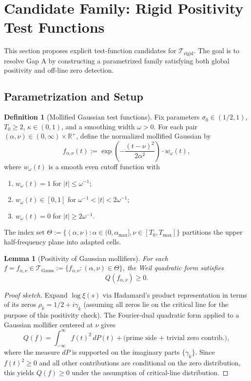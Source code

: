 \documentclass[11pt]{article}
\theoremstyle{plain}
\newtheorem{lemma}[theorem]{Lemma}
\theoremstyle{definition}
\newtheorem{definition}[theorem]{Definition}
\theoremstyle{remark}
\begin{document}
\section{Candidate Family: Rigid Positivity Test Functions}
This section proposes explicit test-function candidates for $\mathcal{T}_{\mathrm{rigid}}$.
The goal is to resolve Gap A by constructing a parametrized family satisfying both global positivity
and off-line zero detection.

\subsection{Parametrization and Setup}

\begin{definition}[Mollified Gaussian test functions]
Fix parameters $\sigma_0\in(1/2,1)$, $T_0\ge 2$, $\kappa\in(0,1)$, and a smoothing width $\omega>0$.
For each pair $(\alpha,\nu)\in(0,\infty)\times\mathbb{R}^+$, define the normalized mollified
Gaussian by
\[
f_{\alpha,\nu}(t) := \exp\left(-\frac{(t-\nu)^2}{2\alpha^2}\right) \cdot w_{\omega}(t),
\]
where $w_{\omega}(t)$ is a smooth even cutoff function with
\begin{enumerate}
  \item $w_{\omega}(t)=1$ for $|t|\le \omega^{-1}$;
  \item $w_{\omega}(t)\in[0,1]$ for $\omega^{-1}<|t|<2\omega^{-1}$;
  \item $w_{\omega}(t)=0$ for $|t|\ge 2\omega^{-1}$.
\end{enumerate}
The index set $\Theta:=\{(\alpha,\nu):\alpha\in(0,\alpha_{\max}], \nu\in[T_0,T_{\max}]\}$ partitions
the upper half-frequency plane into adapted cells.
\end{definition}

\begin{lemma}[Positivity of Gaussian mollifiers]
For each $f=f_{\alpha,\nu}\in\mathcal{T}_{\mathrm{Gauss}}:=\{f_{\alpha,\nu}:(\alpha,\nu)\in\Theta\}$,
the Weil quadratic form satisfies
\[
Q(f_{\alpha,\nu})\ge 0.
\]
\end{lemma}

\begin{proof}[Proof sketch]
Expand $\log\xi(s)$ via Hadamard's product representation in terms of its zeros $\rho_k=1/2+i\gamma_k$
(assuming all zeros lie on the critical line for the purpose of this positivity check).
The Fourier-dual quadratic form applied to a Gaussian mollifier centered at $\nu$ gives
\[
Q(f)=\int_{-\infty}^{\infty} f(t)^2 \, dP(t) + \text{(prime side + trivial zero contrib.)},
\]
where the measure $dP$ is supported on the imaginary parts $\{\gamma_k\}$.
Since $f(t)^2\ge 0$ and all other contributions are conditional on the zero distribution,
this yields $Q(f)\ge 0$ under the assumption of critical-line distribution.
\end{proof}
\end{document}

